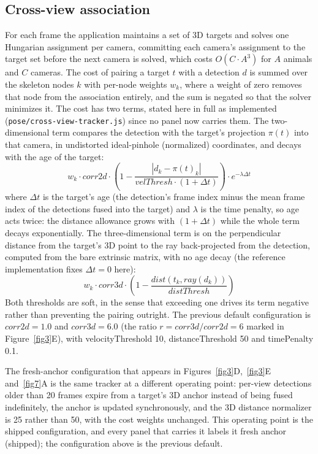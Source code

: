 \documentclass[pdflatex, sn-nature]{sn-jnl}
\theoremstyle{thmstyleone}%
\theoremstyle{thmstyletwo}%
\theoremstyle{thmstylethree}%
\begin{document}
\subsection{Cross-view association}\label{methods-association}

For each frame the application maintains a set of 3D targets and solves one Hungarian assignment per camera, committing each camera's assignment to the target set before the next camera is solved, which costs $O(C \cdot A^3)$ for $A$ animals and $C$ cameras. The cost of pairing a target $t$ with a detection $d$ is summed over the skeleton nodes $k$ with per-node weights $w_k$, where a weight of zero removes that node from the association entirely, and the sum is negated so that the solver minimizes it. The cost has two terms, stated here in full as implemented (\texttt{pose/cross-view-tracker.js}) since no panel now carries them. The two-dimensional term compares the detection with the target's projection $\pi(t)$ into that camera, in undistorted ideal-pinhole (normalized) coordinates, and decays with the age of the target:
\[
  w_k \cdot corr2d \cdot \left(1 - \frac{|d_k - \pi(t)_k|}{velThresh \cdot (1 + \Delta t)}\right) \cdot e^{-\lambda \Delta t}
\]
where $\Delta t$ is the target's age (the detection's frame index minus the mean frame index of the detections fused into the target) and $\lambda$ is the time penalty, so age acts twice: the distance allowance grows with $(1 + \Delta t)$ while the whole term decays exponentially. The three-dimensional term is on the perpendicular distance from the target's 3D point to the ray back-projected from the detection, computed from the bare extrinsic matrix, with no age decay (the reference implementation fixes $\Delta t = 0$ here):
\[
  w_k \cdot corr3d \cdot \left(1 - \frac{dist(t_k, ray(d_k))}{distThresh}\right)
\]
Both thresholds are soft, in the sense that exceeding one drives its term negative rather than preventing the pairing outright. The previous default configuration is $corr2d = 1.0$ and $corr3d = 6.0$ (the ratio $r = corr3d/corr2d = 6$ marked in Figure~\ref{fig3}E), with velocityThreshold 10, distanceThreshold 50 and timePenalty 0.1.

The fresh-anchor configuration that appears in Figures~\ref{fig3}D,~\ref{fig3}E and~\ref{fig7}A is the same tracker at a different operating point: per-view detections older than 20 frames expire from a target's 3D anchor instead of being fused indefinitely, the anchor is updated synchronously, and the 3D distance normalizer is 25 rather than 50, with the cost weights unchanged. This operating point is the shipped configuration, and every panel that carries it labels it fresh anchor (shipped); the configuration above is the previous default.
\end{document}
